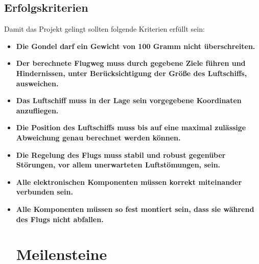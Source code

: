 \documentclass[lang=ngerman,inputenc=utf8,fontsize=10pt]{ldvarticle}
\begin{document}
\subsection*{Erfolgskriterien}
Damit das Projekt gelingt sollten folgende Kriterien erfüllt sein:
\begin{itemize}
\item \textbf{Die Gondel darf ein Gewicht von 100 Gramm nicht überschreiten.}
\item \textbf{Der berechnete Flugweg muss durch gegebene Ziele führen und Hindernissen, unter Berücksichtigung der Größe des Luftschiffs, ausweichen.}
\item \textbf{Das Luftschiff muss in der Lage sein vorgegebene Koordinaten anzufliegen.}
\item \textbf{Die Position des Luftschiffs muss bis auf eine maximal zulässige Abweichung genau berechnet werden können.}
\item \textbf{Die Regelung des Flugs muss stabil und robust gegenüber Störungen, vor allem unerwarteten Luftstömungen, sein.}
\item \textbf{Alle elektronischen Komponenten müssen korrekt miteinander verbunden sein.}
\item \textbf{Alle Komponenten müssen so fest montiert sein, dass sie während des Flugs nicht abfallen.}

\newpage 
\section{Meilensteine}
\end{itemize}
\end{document}
